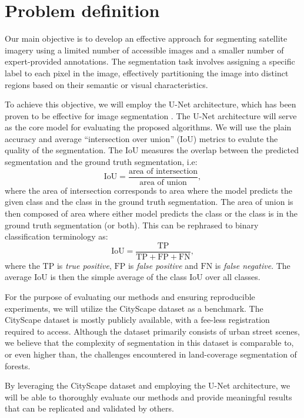 \section{Problem definition}
Our main objective is to develop an effective approach for segmenting satellite imagery using a limited number of 
accessible images and a smaller number of expert-provided annotations. The segmentation task involves assigning a 
specific label to each pixel in the image, effectively partitioning the image into distinct regions based on their 
semantic or visual characteristics.

To achieve this objective, we will employ the U-Net architecture, which has been proven to be effective for image 
segmentation \cite{unet-2015}. The U-Net architecture will serve as the core model for evaluating the proposed algorithms.
We will use the plain accuracy and average ``intersection over union'' (IoU) metrics to evalute the 
quality of the segmentation. The IoU measures the overlap between the predicted segmentation and the ground truth 
segmentation, i.e:
$$
\mathrm{IoU} = \frac{\text{area of intersection}}{\text{area of union}},
$$
where the area of intersection corresponds to area where the model predicts the given class and the class in the ground truth segmentation.
The area of union is then composed of area where either model predicts the class or the class is in the ground truth segmentation (or both).
This can be rephrased to binary classification terminology as: 
$$
\mathrm{IoU} = \frac{\mathrm{TP}}{\mathrm{TP}+\mathrm{FP}+\mathrm{FN}},
$$
where the $\mathrm{TP}$ is \textit{true positive}, $\mathrm{FP}$ is \textit{false positive} and $\mathrm{FN}$ is \textit{false negative}. 
The average IoU is then the simple average of the class IoU over all classes. 

For the purpose of evaluating our methods and ensuring reproducible experiments, we will utilize the CityScape 
dataset \cite{cityscapes-2016} as a benchmark. The CityScape dataset is mostly publicly available, with a fee-less 
registration required to access. Although the dataset primarily consists of urban street scenes, we believe 
that the complexity of segmentation in this dataset is comparable to, or even higher than, the challenges encountered in 
land-coverage segmentation of forests.

By leveraging the CityScape dataset and employing the U-Net architecture, we will be able to thoroughly evaluate our 
methods and provide meaningful results that can be replicated and validated by others.

